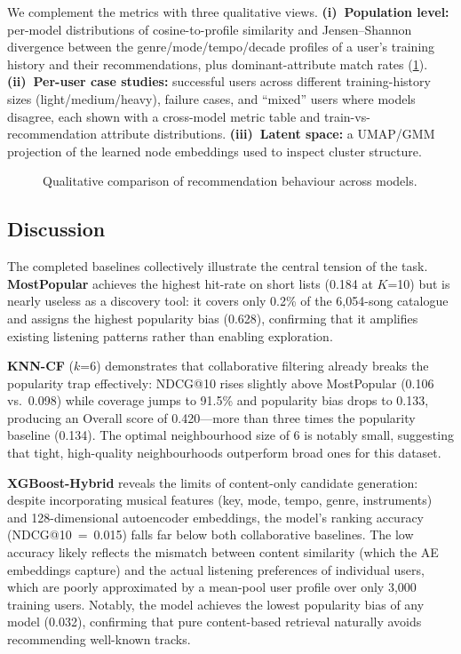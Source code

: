 We complement the metrics with three qualitative views.
\textbf{(i)~Population level:} per-model distributions of cosine-to-profile
similarity and Jensen--Shannon divergence between the genre/mode/tempo/decade
profiles of a user's training history and their recommendations, plus
dominant-attribute match rates (\cref{fig:qual}).
\textbf{(ii)~Per-user case studies:} successful users across different
training-history sizes (light/medium/heavy), failure cases, and ``mixed'' users
where models disagree, each shown with a cross-model metric table and
train-vs-recommendation attribute distributions.
\textbf{(iii)~Latent space:} a UMAP/GMM projection of the learned node
embeddings used to inspect cluster structure.

\begin{figure}[t]
\centering
{}
\caption{Qualitative comparison of recommendation behaviour across models.}
\label{fig:qual}
\end{figure}

\subsection{Discussion}

The completed baselines collectively illustrate the central tension of the
task. \textbf{MostPopular} achieves the highest hit-rate on short lists
(0.184 at $K$=10) but is nearly useless as a discovery tool: it covers only
0.2\% of the 6{,}054-song catalogue and assigns the highest popularity bias
(0.628), confirming that it amplifies existing listening patterns rather than
enabling exploration.

\textbf{KNN-CF} ($k$=6) demonstrates that collaborative filtering already
breaks the popularity trap effectively: NDCG@10 rises slightly above
MostPopular (0.106 vs.\ 0.098) while coverage jumps to 91.5\% and popularity
bias drops to 0.133, producing an Overall score of 0.420---more than three
times the popularity baseline (0.134). The optimal neighbourhood size of 6 is
notably small, suggesting that tight, high-quality neighbourhoods outperform
broad ones for this dataset.

\textbf{XGBoost-Hybrid} reveals the limits of content-only candidate
generation: despite incorporating musical features (key, mode, tempo, genre,
instruments) and 128-dimensional autoencoder embeddings, the model's ranking
accuracy (NDCG@10~=~0.015) falls far below both collaborative baselines. The
low accuracy likely reflects the mismatch between content similarity (which
the AE embeddings capture) and the actual listening preferences of individual
users, which are poorly approximated by a mean-pool user profile over only
3{,}000 training users. Notably, the model achieves the lowest popularity bias
of any model (0.032), confirming that pure content-based retrieval naturally
avoids recommending well-known tracks.

